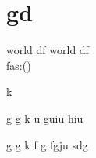 \documentclass{article}
\author{Michele}
\begin{document}
\section{gd}
	world df \textbf{\gitRel}
	world df \textbf{\gitRel}\\
	fas:\gitRoff(\gitCommitterDate)\\
	\begin{changelog}[author=Michele]
		\begin{version}[version=1.20]
			\added
			\item k
		\end{version}
		
		\begin{version}[version=\gitReln]
			\added
			\item  g g k u guiu  hiu
		\end{version}
		
		\begin{version}[version=\gitReln]
			\added
			\item  g g k f g fgju sdg
		\end{version} 
	\end{changelog}

\begin{versionhistory}
\end{versionhistory}
\end{document}
